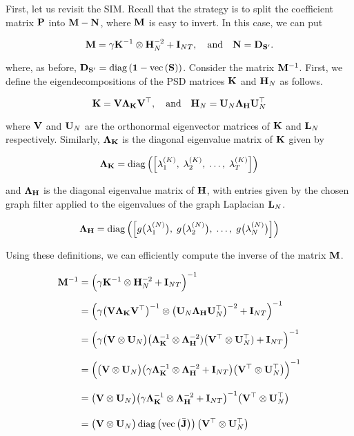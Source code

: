 First, let us revisit the SIM. Recall that the strategy is to split the coefficient matrix $\mathbf{P}$ into $\mathbf{M} - \mathbf{N}$, where $\mathbf{M}$ is easy to invert. In this case, we can put

\begin{equation}
    \mathbf{M} = \gamma \mathbf{K}^{-1} \otimes \mathbf{H}_N^{-2} + \mathbf{I}_{NT}, \quad \text{and} \quad \mathbf{N} = \mathbf{D}_{\mathbf{S}'}.
\end{equation}

where, as before, $\mathbf{D}_{\mathbf{S}'} = \text{\textup{diag}}\left(\mathbf{1} - \text{\textup{vec}}\left(\mathbf{S}\right)\right)$. Consider the matrix $\mathbf{M}^{-1}$. First, we define the eigendecompositions of the PSD matrices $\mathbf{K}$ and $\mathbf{H}_N$ as follows. 

\begin{equation}
    \mathbf{K} = \mathbf{V} \mathbf{\Lambda}_{\mathbf{K}} \mathbf{V}^\top, \quad \text{and} \quad \mathbf{H}_N = \mathbf{U}_N \mathbf{\Lambda}_{\mathbf{H}} \mathbf{U}_N^\top
\end{equation}

where $\mathbf{V}$ and $\mathbf{U}_N$ are the orthonormal eigenvector matrices of $\mathbf{K}$ and $\mathbf{L}_N$ respectively. Similarly, $\mathbf{\Lambda}_{\mathbf{K}}$ is the diagonal eigenvalue matrix of $\mathbf{K}$ given by


$$
\mathbf{\Lambda}_{\mathbf{K}} = \text{\textup{diag}}\left(\left[\lambda^{(K)}_1, \; \lambda^{(K)}_2, \; \dots, \;\lambda^{(K)}_T \right]\right)
$$

and $\mathbf{\Lambda}_{\mathbf{H}}$ is the diagonal eigenvalue matrix of $\mathbf{H}$, with entries given by the chosen graph filter applied to the eigenvalues of the graph Laplacian $\mathbf{L}_N$. 

$$
\mathbf{\Lambda}_{\mathbf{H}} = \text{\textup{diag}}\left(\left[g\big(\lambda^{(N)}_1\big), \; g\big(\lambda^{(N)}_2\big), \; \dots, \; g\big(\lambda^{(N)}_N\big) \right]\right)
$$

Using these definitions, we can efficiently compute the inverse of the matrix $\mathbf{M}$.  

\begin{align}
    \label{eq:M_inv_kgr}
    \mathbf{M}^{-1} &= \Big(\gamma \mathbf{K}^{-1} \otimes \mathbf{H}_N^{-2} + \mathbf{I}_{NT}\Big)^{-1} \notag \\[0.2cm]
    &= \Big(\gamma \big(\mathbf{V} \mathbf{\Lambda}_{\mathbf{K}} \mathbf{V}^\top\big)^{-1} \otimes \big(\mathbf{U}_N \mathbf{\Lambda}_{\mathbf{H}} \mathbf{U}_N^\top\big)^{-2} + \mathbf{I}_{NT}\Big)^{-1} \notag \\[0.2cm]
    &= \Big(\gamma \big(\mathbf{V} \otimes \mathbf{U}_N \big) \big(\mathbf{\Lambda}_{\mathbf{K}}^{-1} \otimes \mathbf{\Lambda}_{\mathbf{H}}^{-2}) \big(\mathbf{V}^\top \otimes \mathbf{U}_N^\top) + \mathbf{I}_{NT}\Big)^{-1} \notag \\[0.25cm]
    &= \Big( \big(\mathbf{V} \otimes \mathbf{U}_N \big) \big(\gamma \mathbf{\Lambda}_{\mathbf{K}}^{-1} \otimes \mathbf{\Lambda}_{\mathbf{H}}^{-2} + \mathbf{I}_{NT}\big) \big(\mathbf{V}^\top \otimes \mathbf{U}_N^\top\big)\Big)^{-1} \notag \\[0.3cm]
    &= \big(\mathbf{V} \otimes \mathbf{U}_N\big ) \big(\gamma  \mathbf{\Lambda}_{\mathbf{K}}^{-1} \otimes \mathbf{\Lambda}_{\mathbf{H}}^{-2} + \mathbf{I}_{NT}\big)^{-1} \big(\mathbf{V}^\top \otimes \mathbf{U}_N^\top\big) \notag \\[0.35cm]
    &= \big(\mathbf{V} \otimes \mathbf{U}_N \big) \, \text{\textup{diag}}\left(\text{\textup{vec}}\left(\bar{\mathbf{J}}\right)\right)\big(\mathbf{V}^\top \otimes \mathbf{U}_N^\top\big)
\end{align}


